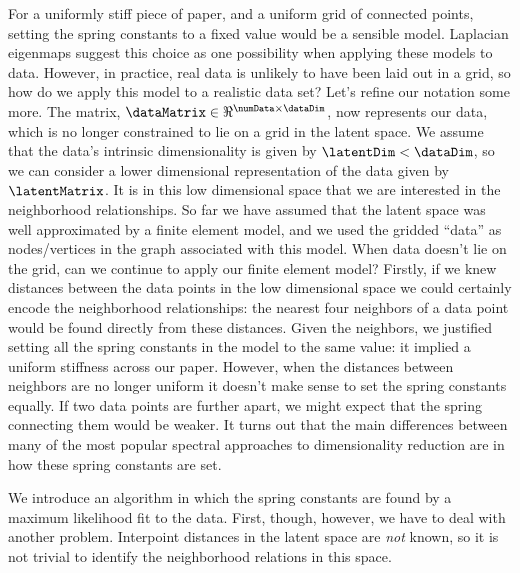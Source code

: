For a uniformly stiff piece of paper, and a uniform grid of connected
points, setting the spring constants to a fixed value would be a
sensible model. Laplacian eigenmaps \citep{Belkin:laplacian03} suggest
this choice as one possibility when applying these models to
data. However, in practice, real data is unlikely to have been laid
out in a grid, so how do we apply this model to a realistic data set?
Let's refine our notation some more. The matrix, $\dataMatrix\in
\Re^{\numData\times \dataDim}$, now represents our data, which is no
longer constrained to lie on a grid in the latent space. We assume
that the data's intrinsic dimensionality is given by
$\latentDim<\dataDim$, so we can consider a lower dimensional
representation of the data given by $\latentMatrix$. It is in this low
dimensional space that we are interested in the neighborhood
relationships. So far we have assumed that the latent space was well
approximated by a finite element model, and we used the gridded
``data'' as nodes/vertices in the graph associated with this
model. When data doesn't lie on the grid, can we continue to apply our
finite element model? Firstly, if we knew distances between the data
points in the low dimensional space we could certainly encode the
neighborhood relationships: the nearest four neighbors of a data point
would be found directly from these distances. Given the neighbors, we
justified setting all the spring constants in the model to the same
value: it implied a uniform stiffness across our paper. However, when
the distances between neighbors are no longer uniform it doesn't make
sense to set the spring constants equally. If two data points are
further apart, we might expect that the spring connecting them would
be weaker. It turns out that the main differences between many of the
most popular spectral approaches to dimensionality reduction are in
how these spring constants are set. 

We introduce an algorithm in which the spring constants are found by a
maximum likelihood fit to the data. First, though, however, we have to
deal with another problem. Interpoint distances in the latent space
are \emph{not} known, so it is not trivial to identify the
neighborhood relations in this space.

